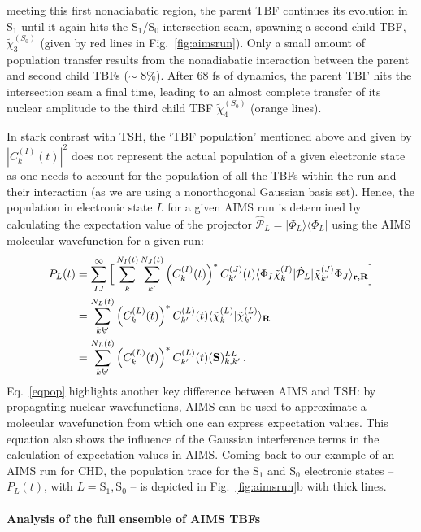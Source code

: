 \documentclass[9pt,bestpractices]{livecoms}
\newcommand{\bs}{\mathbf}
\begin{document}
meeting this first nonadiabatic region, the parent TBF continues its evolution in S$_1$ until it again hits the S$_1$/S$_0$ intersection seam, spawning a second child TBF, $\tilde{\chi}_{3}^{(S_0)}$ (given by red lines in Fig.~\ref{fig:aimsrun}). Only a small amount of population transfer results from the nonadiabatic interaction between the parent and second child TBFs ($\sim$ 8\%). After 68 fs of dynamics, the parent TBF hits the intersection seam a final time, leading to an almost complete transfer of its nuclear amplitude to the third child TBF $\tilde{\chi}_{4}^{(S_0)}$ (orange lines).

In stark contrast with TSH, the `TBF population' mentioned above and given by $|C_{k}^{(I)}(t)|^2$ does not represent the actual population of a given electronic state as one needs to account for the population of all the TBFs within the run and their interaction (as we are using a nonorthogonal Gaussian basis set). Hence, the population in electronic state $L$ for a given AIMS run is determined by calculating the expectation value of the projector $\hat{\mathcal{P}}_L = | \Phi_L \rangle\langle \Phi_L |$ using the AIMS molecular wavefunction for a given run:
\begin{align}
P_L(t) &  = \sum_{IJ}^\infty \Big[ \sum_k^{N_I(t)}\sum_{k'}^{N_J(t)}
\left(C_{k}^{(I)}(t)\right)^\ast C_{k'}^{(J)}(t)  \langle   \Phi_I \tilde{\chi}_{k}^{(I)} |  \hat{\mathcal{P}}_L  | \tilde{\chi}_{k'}^{(J)} \Phi_J \rangle_{\bs r, \bs R}
\Big] \notag \\
& =  \sum_{kk'}^{N_L(t)}\left(C_{k}^{(L)}(t)\right)^\ast C_{k'}^{(L)}(t)  \langle \tilde{\chi}_{k}^{(L)}  | \tilde{\chi}_{k'}^{(L)}  \rangle_{\bs R}  \notag \\
&=   \sum_{kk'}^{N_L(t)} \left(C_{k}^{(L)}(t)\right)^\ast C_{k'}^{(L)}(t)  (\bs S)^{LL}_{k,k'} \, .
\label{eqpop}
\end{align}
Eq.~\eqref{eqpop} highlights another key difference between AIMS and TSH: by propagating nuclear wavefunctions, AIMS can be used to approximate a molecular wavefunction from which one can express expectation values. This equation also shows the influence of the Gaussian interference terms in the calculation of expectation values in AIMS. Coming back to our example of an AIMS run for CHD, the population trace for the S$_1$ and S$_0$ electronic states -- $P_{L}(t)$, with $L=\text{S}_1,\text{S}_0$ -- is depicted in Fig.~\ref{fig:aimsrun}b with thick lines. 

\paragraph{Analysis of the full ensemble of AIMS TBFs}
\end{document}
